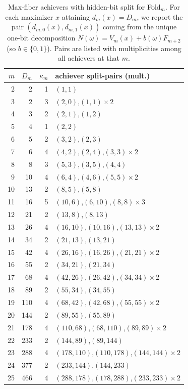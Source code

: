 \begin{table}[H]
\centering
\scriptsize
\setlength{\tabcolsep}{6pt}
\caption{Max-fiber achievers with hidden-bit split for Fold$_m$. For each maximizer $x$ attaining $d_m(x)=D_m$, we report the pair $(d_{m,0}(x),d_{m,1}(x))$ coming from the unique one-bit decomposition $N(\omega)=V_m(x)+b(\omega)F_{m+2}$ (so $b\in\{0,1\}$). Pairs are listed with multiplicities among all achievers at that $m$.}
\label{tab:fold_max_fiber_achievers_bsplit}
\begin{tabular}{r r r l}
\toprule
$m$ & $D_m$ & $\kappa_m$ & achiever split-pairs (mult.)\\
\midrule
2 & 2 & 1 & $(1,1)$\\
3 & 2 & 3 & $(2,0)$,\;$(1,1)\times 2$\\
4 & 3 & 2 & $(2,1)$,\;$(1,2)$\\
5 & 4 & 1 & $(2,2)$\\
6 & 5 & 2 & $(3,2)$,\;$(2,3)$\\
7 & 6 & 4 & $(4,2)$,\;$(2,4)$,\;$(3,3)\times 2$\\
8 & 8 & 3 & $(5,3)$,\;$(3,5)$,\;$(4,4)$\\
9 & 10 & 4 & $(6,4)$,\;$(4,6)$,\;$(5,5)\times 2$\\
10 & 13 & 2 & $(8,5)$,\;$(5,8)$\\
11 & 16 & 5 & $(10,6)$,\;$(6,10)$,\;$(8,8)\times 3$\\
12 & 21 & 2 & $(13,8)$,\;$(8,13)$\\
13 & 26 & 4 & $(16,10)$,\;$(10,16)$,\;$(13,13)\times 2$\\
14 & 34 & 2 & $(21,13)$,\;$(13,21)$\\
15 & 42 & 4 & $(26,16)$,\;$(16,26)$,\;$(21,21)\times 2$\\
16 & 55 & 2 & $(34,21)$,\;$(21,34)$\\
17 & 68 & 4 & $(42,26)$,\;$(26,42)$,\;$(34,34)\times 2$\\
18 & 89 & 2 & $(55,34)$,\;$(34,55)$\\
19 & 110 & 4 & $(68,42)$,\;$(42,68)$,\;$(55,55)\times 2$\\
20 & 144 & 2 & $(89,55)$,\;$(55,89)$\\
21 & 178 & 4 & $(110,68)$,\;$(68,110)$,\;$(89,89)\times 2$\\
22 & 233 & 2 & $(144,89)$,\;$(89,144)$\\
23 & 288 & 4 & $(178,110)$,\;$(110,178)$,\;$(144,144)\times 2$\\
24 & 377 & 2 & $(233,144)$,\;$(144,233)$\\
25 & 466 & 4 & $(288,178)$,\;$(178,288)$,\;$(233,233)\times 2$\\

\end{tabular}
\end{table}
